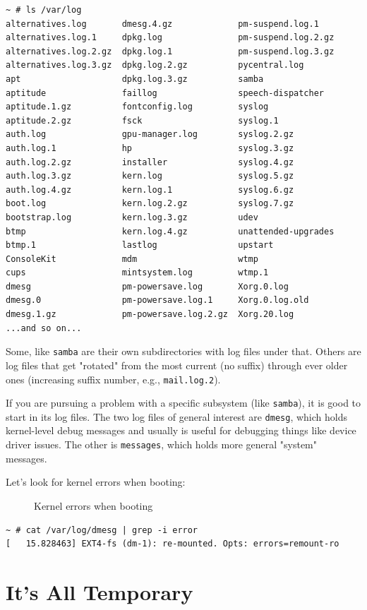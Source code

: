 \documentclass[10pt,]{book}
\numberwithin{figure}{chapter}
\DeclareRobustCommand{\drcap}[1]{\begin{figure}[H]\caption{#1}\end{figure}}
\begin{document}
\begin{verbatim}
~ # ls /var/log
alternatives.log       dmesg.4.gz             pm-suspend.log.1
alternatives.log.1     dpkg.log               pm-suspend.log.2.gz
alternatives.log.2.gz  dpkg.log.1             pm-suspend.log.3.gz
alternatives.log.3.gz  dpkg.log.2.gz          pycentral.log
apt                    dpkg.log.3.gz          samba
aptitude               faillog                speech-dispatcher
aptitude.1.gz          fontconfig.log         syslog
aptitude.2.gz          fsck                   syslog.1
auth.log               gpu-manager.log        syslog.2.gz
auth.log.1             hp                     syslog.3.gz
auth.log.2.gz          installer              syslog.4.gz
auth.log.3.gz          kern.log               syslog.5.gz
auth.log.4.gz          kern.log.1             syslog.6.gz
boot.log               kern.log.2.gz          syslog.7.gz
bootstrap.log          kern.log.3.gz          udev
btmp                   kern.log.4.gz          unattended-upgrades
btmp.1                 lastlog                upstart
ConsoleKit             mdm                    wtmp
cups                   mintsystem.log         wtmp.1
dmesg                  pm-powersave.log       Xorg.0.log
dmesg.0                pm-powersave.log.1     Xorg.0.log.old
dmesg.1.gz             pm-powersave.log.2.gz  Xorg.20.log
...and so on...
\end{verbatim}

Some, like \texttt{samba} are their own subdirectories with log files
under that. Others are log files that get "rotated" from the most
current (no suffix) through ever older ones (increasing suffix number,
e.g., \texttt{mail.log.2}).

If you are pursuing a problem with a specific subsystem (like
\texttt{samba}), it is good to start in its log files. The two log files
of general interest are \texttt{dmesg}, which holds
kernel-level debug messages and usually is useful for debugging things
like device driver issues. The other is
\texttt{messages}, which holds more general "system"
messages.

Let's look for kernel errors when booting:

\drcap{Kernel errors when booting}

\begin{verbatim}
~ # cat /var/log/dmesg | grep -i error
[   15.828463] EXT4-fs (dm-1): re-mounted. Opts: errors=remount-ro
\end{verbatim}

\section*{It's All Temporary}\label{its-all-temporary}
\end{document}
